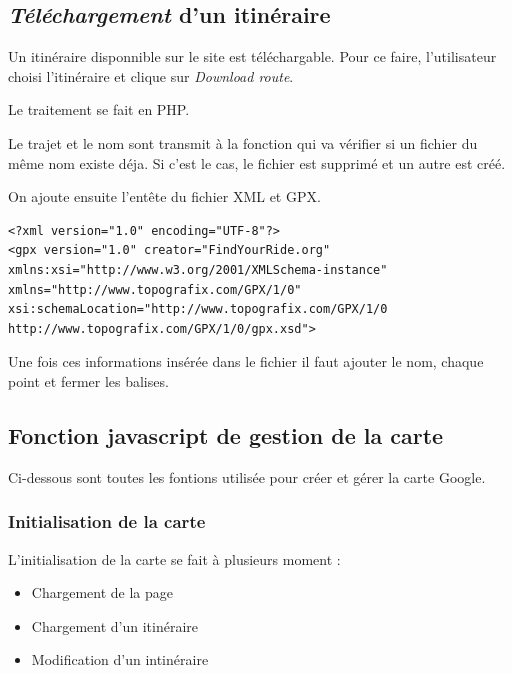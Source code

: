 \documentclass[a4paper]{article}
\newcommand{\diag}[1]{}
\begin{document}
\begin{center}
	\diag{Gpx2Sql}
\end{center}


\subsection{\emph{Téléchargement} d'un itinéraire}
Un itinéraire disponnible sur le site est téléchargable.
Pour ce faire, l'utilisateur choisi l'itinéraire et clique sur \emph{Download route}.

Le traitement se fait en PHP.

Le trajet et le nom sont transmit à la fonction qui va  vérifier si un fichier du même nom existe déja. Si c'est le cas, le fichier est supprimé et un autre est créé. 

On ajoute ensuite l'entête du fichier XML et GPX.

\lstset{language=XML}
\begin{lstlisting}[frame=single] 
<?xml version="1.0" encoding="UTF-8"?>
<gpx version="1.0" creator="FindYourRide.org" xmlns:xsi="http://www.w3.org/2001/XMLSchema-instance" xmlns="http://www.topografix.com/GPX/1/0" xsi:schemaLocation="http://www.topografix.com/GPX/1/0 http://www.topografix.com/GPX/1/0/gpx.xsd">
\end{lstlisting}

Une fois ces informations insérée dans le fichier il faut ajouter le nom, chaque point et fermer les balises.

\begin{center}
	\diag{PathToGpx}
\end{center}


\subsection{Fonction javascript de gestion de la carte}
Ci-dessous sont toutes les fontions utilisée pour créer et gérer la carte Google.

\subsubsection{Initialisation de la carte}
L'initialisation de la carte se fait à plusieurs moment : 
\begin{itemize}
	\item Chargement de la page
	\item Chargement d'un itinéraire
	\item Modification d'un intinéraire
\end{itemize}
\end{document}

